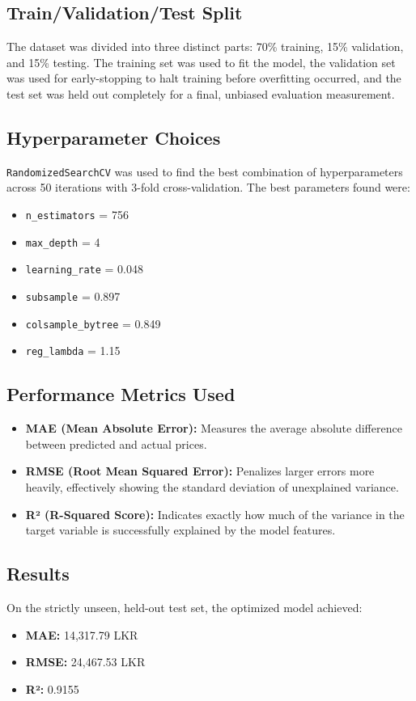 \documentclass[12pt,a4paper]{article}
\begin{document}
\subsection{Train/Validation/Test Split}
The dataset was divided into three distinct parts: 70\% training, 15\% validation, and 15\% testing. 
The training set was used to fit the model, the validation set was used for early-stopping to halt training before overfitting occurred, and the test set was held out completely for a final, unbiased evaluation measurement. 

\subsection{Hyperparameter Choices}
\texttt{RandomizedSearchCV} was used to find the best combination of hyperparameters across 50 iterations with 3-fold cross-validation. 
The best parameters found were: 
\begin{itemize}
    \item \texttt{n\_estimators} = 756 
    \item \texttt{max\_depth} = 4 
    \item \texttt{learning\_rate} = 0.048 
    \item \texttt{subsample} = 0.897 
    \item \texttt{colsample\_bytree} = 0.849 
    \item \texttt{reg\_lambda} = 1.15 
\end{itemize}

\subsection{Performance Metrics Used}
\begin{itemize}
    \item \textbf{MAE (Mean Absolute Error):} Measures the average absolute difference between predicted and actual prices. 
    \item \textbf{RMSE (Root Mean Squared Error):} Penalizes larger errors more heavily, effectively showing the standard deviation of unexplained variance. 
    \item \textbf{R² (R-Squared Score):} Indicates exactly how much of the variance in the target variable is successfully explained by the model features. 
\end{itemize}

\subsection{Results}
On the strictly unseen, held-out test set, the optimized model achieved: 
\begin{itemize}
    \item \textbf{MAE:} 14,317.79 LKR 
    \item \textbf{RMSE:} 24,467.53 LKR 
    \item \textbf{R²:} 0.9155
\end{itemize}
\end{document}
